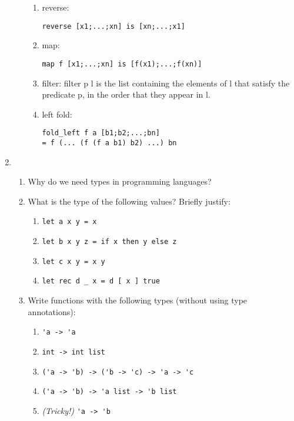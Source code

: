 \documentclass[11pt,a4paper]{article}
\begin{document}
\begin{enumerate}
\begin{enumerate}
    \begin{enumerate}
        \item reverse:
        \begin{verbatim}
reverse [x1;...;xn] is [xn;...;x1]
\end{verbatim}

        \item map:
        \begin{verbatim}
map f [x1;...;xn] is [f(x1);...;f(xn)]
\end{verbatim}

        \item filter: filter p l is the list containing the elements of l that 
        satisfy the predicate p, in the order that they appear in l.

        \item left fold:
        \begin{verbatim}
fold_left f a [b1;b2;...;bn]
= f (... (f (f a b1) b2) ...) bn
\end{verbatim}
    \end{enumerate}
\end{enumerate}

\item
\begin{enumerate}
    \item Why do we need types in programming languages?

    \item What is the type of the following values? Briefly justify:
    \begin{enumerate}
        \item \begin{verbatim}
let a x y = x
\end{verbatim}
        \item \begin{verbatim}
let b x y z = if x then y else z
\end{verbatim}
        \item \begin{verbatim}
let c x y = x y
\end{verbatim}
        \item \begin{verbatim}
let rec d _ x = d [ x ] true
\end{verbatim}
    \end{enumerate}

    \item Write functions with the following types (without using type annotations):
    \begin{enumerate}
        \item \verb|'a -> 'a|
        \item \verb|int -> int list|
        \item \verb|('a -> 'b) -> ('b -> 'c) -> 'a -> 'c|
        \item \verb|('a -> 'b) -> 'a list -> 'b list|
        \item \emph{(Tricky!)} \verb|'a -> 'b| 
    \end{enumerate}
\end{enumerate}

\end{enumerate}
\end{document}
